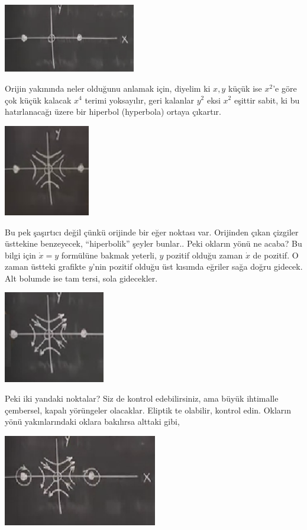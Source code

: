 \documentclass[12pt,fleqn]{article}\usepackage{../../common}
\begin{document}
\includegraphics[height=3cm]{07_04.png}

Orijin yakınında neler olduğunu anlamak için, diyelim ki $x,y$ küçük ise $x^2$'e
göre çok küçük kalacak $x^4$ terimi yoksayılır, geri kalanlar $y^2$ eksi $x^2$
eşittir sabit, ki bu hatırlanacağı üzere bir hiperbol (hyperbola) ortaya
çıkartır. 

\includegraphics[height=4cm]{07_05.png}

Bu pek şaşırtıcı değil çünkü orijinde bir eğer noktası var. Orijinden çıkan
çizgiler üsttekine benzeyecek, ``hiperbolik'' şeyler bunlar.. Peki okların yönü
ne acaba? Bu bilgi için $\dot{x} = y$ formülüne bakmak yeterli, $y$ pozitif
olduğu zaman $\dot{x}$ de pozitif. O zaman üstteki grafikte $y$'nin pozitif
olduğu üst kısımda eğriler sağa doğru gidecek. Alt bolumde ise tam tersi, sola
gidecekler. 

\includegraphics[height=4cm]{07_06.png}

Peki iki yandaki noktalar? Siz de kontrol edebilirsiniz, ama büyük ihtimalle
çembersel, kapalı yörüngeler olacaklar. Eliptik te olabilir, kontrol
edin. Okların yönü yakınlarındaki oklara bakılırsa alttaki gibi,

\includegraphics[height=4cm]{07_07.png}
\end{document}
